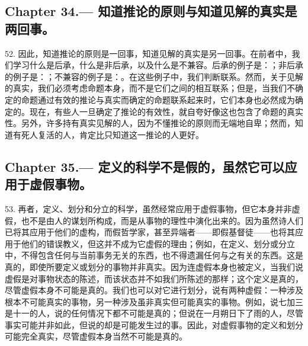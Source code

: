 
\subsection{Chapter 34.— 知道推论的原则与知道见解的真实是两回事。}

52. 因此，知道推论的原则是一回事，知道见解的真实是另一回事。在前者中，我们学习什么是后承，什么是非后承，以及什么是不兼容。后承的例子是：；非后承的例子是：；不兼容的例子是：。在这些例子中，我们判断联系。然而，关于见解的真实，我们必须考虑命题本身，而不是它们之间的相互联系；但是，当我们不确定的命题通过有效的推论与真实而确定的命题联系起来时，它们本身也必然成为确定的。现在，有些人一旦确定了推论的有效性，就自夸好像这也包含了命题的真实性。另外，许多持有真实见解的人，因为不懂推论的原则而无端地自卑；然而，知道有死人复活的人，肯定比只知道这一推论的人更好。\par


\subsection{Chapter 35.— 定义的科学不是假的，虽然它可以应用于虚假事物。}

53. 再者，定义、划分和分立的科学，虽然经常应用于虚假事物，但它本身并非虚假，也不是由人的谋划所构成，而是从事物的理性中演化出来的。因为虽然诗人们已将其应用于他们的虚构，而假哲学家，甚至异端者——即假基督徒——也将其应用于他们的错误教义，但这并不成为它虚假的理由；例如，在定义、划分或分立中，不得包含任何与当前事务无关的东西，也不得遗漏任何与之有关的东西。这是真的，即使所要定义或划分的事物并非真实。因为连虚假本身也被定义，当我们说虚假是对事物状态的陈述，而该状态并不如我们所陈述的那样；这个定义是真的，尽管虚假本身不可能是真的。我们也可以对它进行划分，说有两种虚假：一种涉及根本不可能真实的事物，另一种涉及虽非真实但可能真实的事物。例如，说七加三是十一的人，说的任何情况下都不可能是真的；但说在一月朔日下了雨的人，尽管事实可能并非如此，但说的却是可能发生过的事。因此，对虚假事物的定义和划分可能完全真实，尽管虚假本身当然不可能是真的。\par


